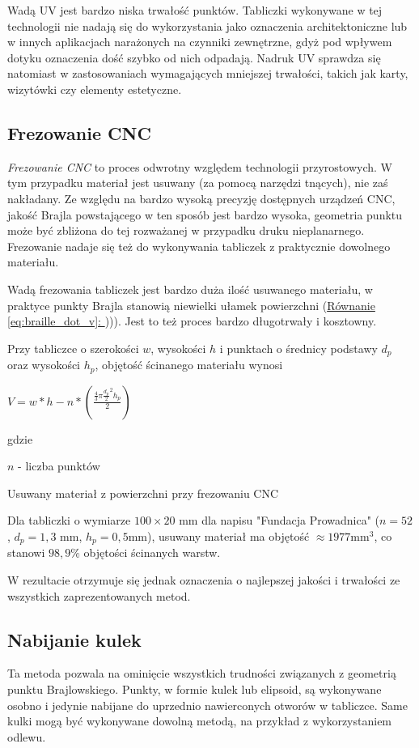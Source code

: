\documentclass[12pt,a4paper]{article}
\newcommand*{\feqref}[1]{(\hyperref[{#1}]{Równanie \ref{#1}: \nameref*{#1}})}
\begin{document}
Wadą UV jest bardzo niska trwałość punktów. Tabliczki wykonywane w tej technologii nie nadają się do wykorzystania jako oznaczenia architektoniczne lub w innych aplikacjach narażonych na czynniki zewnętrzne, gdyż pod wpływem dotyku oznaczenia dość szybko od nich odpadają.
Nadruk UV sprawdza się natomiast w zastosowaniach wymagających mniejszej trwałości, takich jak karty, wizytówki czy elementy estetyczne.

\subsection{Frezowanie CNC}
\emph{Frezowanie CNC} to proces odwrotny względem technologii przyrostowych. W tym przypadku materiał jest usuwany (za pomocą narzędzi tnących), nie zaś nakładany. Ze względu na bardzo wysoką precyzję dostępnych urządzeń CNC, jakość Brajla powstającego w ten sposób jest bardzo wysoka, geometria punktu może być zbliżona do tej rozważanej w przypadku druku nieplanarnego. Frezowanie nadaje się też do wykonywania tabliczek z praktycznie dowolnego materiału.

Wadą frezowania tabliczek jest bardzo duża ilość usuwanego materiału, w praktyce punkty Brajla stanowią niewielki ułamek powierzchni \feqref{eq:braille_dot_v})). Jest to też proces bardzo długotrwały i kosztowny.

Przy tabliczce o szerokości $w$, wysokości $h$ i punktach o średnicy podstawy $d_p$ oraz wysokości $h_p$, objętość ścinanego materiału wynosi

\begin{feq}
$V = w*h - n * \left(\frac{\frac{4}{3}\pi \frac{d_p}{2}^2h_p}{2}\right)$

gdzie

$n$ - liczba punktów
\caption{Usuwany materiał z powierzchni przy frezowaniu CNC}
\end{feq}
Dla tabliczki o wymiarze $100 \times 20 \text{ mm}$ dla napisu "Fundacja Prowadnica" ($n=52$, $d_p=1{,}3 \text{ mm}$, $h_p=0{,}5 \text{mm}$), usuwany materiał ma objętość $\approx 1977 \text{mm}^3$, co stanowi $98{,}9\text{\%}$ objętości ścinanych warstw.

W rezultacie otrzymuje się jednak oznaczenia o najlepszej jakości i trwałości ze wszystkich zaprezentowanych metod.

\subsection{Nabijanie kulek}
Ta metoda pozwala na ominięcie wszystkich trudności związanych z geometrią punktu Brajlowskiego.
Punkty, w formie kulek lub elipsoid, są wykonywane osobno i jedynie nabijane do uprzednio nawierconych otworów w tabliczce. Same kulki mogą być wykonywane dowolną metodą, na przykład z wykorzystaniem odlewu.
\end{document}
